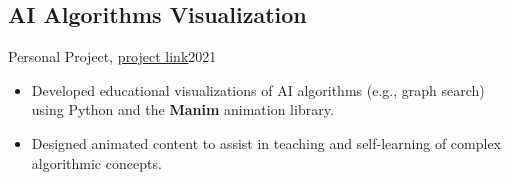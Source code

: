 \subsection{AI Algorithms Visualization}{Personal Project, \href{https://github.com/Danial-Kord/Artificial-Intelligence-Visualization}{project link}}{2021}
\begin{itemize}
    \item Developed educational visualizations of AI algorithms (e.g., graph search) using Python and the \textbf{Manim} animation library.
    \item Designed animated content to assist in teaching and self-learning of complex algorithmic concepts.
\end{itemize}
